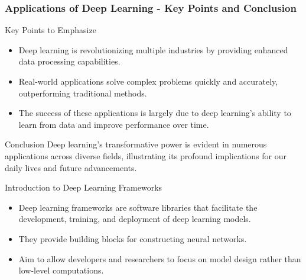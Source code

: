 \documentclass[aspectratio=169]{beamer}
\begin{document}
\begin{frame}[fragile]
    \frametitle{Applications of Deep Learning - Key Points and Conclusion}
    \begin{block}{Key Points to Emphasize}
        \begin{itemize}
            \item Deep learning is revolutionizing multiple industries by providing enhanced data processing capabilities.
            \item Real-world applications solve complex problems quickly and accurately, outperforming traditional methods.
            \item The success of these applications is largely due to deep learning's ability to learn from data and improve performance over time.
        \end{itemize}
    \end{block}

    \begin{block}{Conclusion}
        Deep learning's transformative power is evident in numerous applications across diverse fields, illustrating its profound implications for our daily lives and future advancements.
    \end{block}
\end{frame}

\begin{frame}{Introduction to Deep Learning Frameworks}
    \begin{itemize}
        \item Deep learning frameworks are software libraries that facilitate the development, training, and deployment of deep learning models.
        \item They provide building blocks for constructing neural networks.
        \item Aim to allow developers and researchers to focus on model design rather than low-level computations.
    \end{itemize}
\end{frame}
\end{document}

